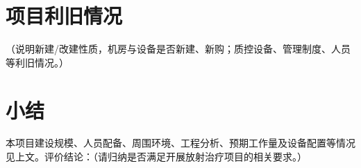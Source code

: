 \section{项目利旧情况}

（说明新建/改建性质，机房与设备是否新建、新购；质控设备、管理制度、人员等利旧情况。）

\section{小结}

本项目建设规模、人员配备、周围环境、工程分析、预期工作量及设备配置等情况见上文。评价结论：（请归纳是否满足开展放射治疗项目的相关要求。）
